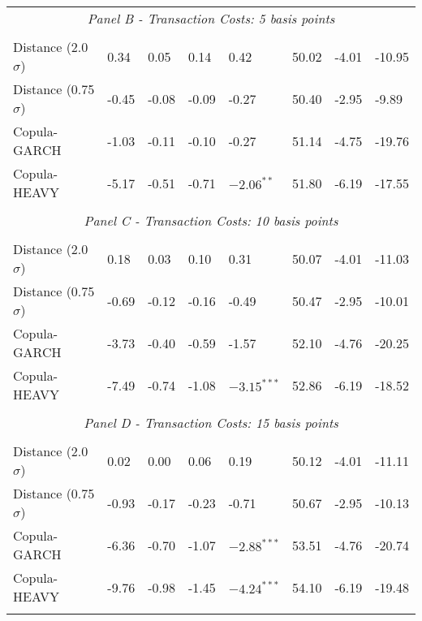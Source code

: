 \documentclass[a4paper,12pt]{report}
\begin{document}
\begin{threeparttable}[H]
\begin{tabularx}{\textwidth}{@{\extracolsep{\fill}}llllllll@{}}
		\multicolumn{8}{c}{\textit{Panel B - Transaction Costs: 5 basis points}} \\
		&       &       &       &       &       &       &  \\
		Distance (2.0$\sigma$) & 0.34  & 0.05  & 0.14  & 0.42  & 50.02 & -4.01  & -10.95 \\
		Distance (0.75$\sigma$) & -0.45 & -0.08 & -0.09 & -0.27 & 50.40 & -2.95  & -9.89 \\
		Copula-GARCH & -1.03 & -0.11 & -0.10 & -0.27 & 51.14 & -4.75  & -19.76 \\
		Copula-HEAVY & -5.17 & -0.51 & -0.71 & $-2.06^{**}$ & 51.80 & -6.19  & -17.55 \\
		\multicolumn{1}{r}{} & \multicolumn{1}{r}{} & \multicolumn{1}{r}{} & \multicolumn{1}{r}{} & \multicolumn{1}{r}{} & \multicolumn{1}{r}{} & \multicolumn{1}{r}{} & \multicolumn{1}{r}{} \\
		\multicolumn{8}{c}{\textit{Panel C - Transaction Costs: 10 basis points}} \\
		&       &       &       &       &       &       &  \\
		Distance (2.0$\sigma$) & 0.18  & 0.03  & 0.10  & 0.31  & 50.07 & -4.01  & -11.03 \\
		Distance (0.75$\sigma$) & -0.69 & -0.12 & -0.16 & -0.49 & 50.47 & -2.95  & -10.01 \\
		Copula-GARCH & -3.73 & -0.40 & -0.59 & -1.57 & 52.10 & -4.76  & -20.25 \\
		Copula-HEAVY & -7.49 & -0.74 & -1.08 & $-3.15^{***}$ & 52.86 & -6.19  & -18.52 \\
		\multicolumn{1}{r}{} & \multicolumn{1}{r}{} & \multicolumn{1}{r}{} & \multicolumn{1}{r}{} & \multicolumn{1}{r}{} & \multicolumn{1}{r}{} & \multicolumn{1}{r}{} & \multicolumn{1}{r}{} \\
		\multicolumn{8}{c}{\textit{Panel D - Transaction Costs: 15 basis points}} \\
		&       &       &       &       &       &       &  \\
		Distance (2.0$\sigma$) & 0.02  & 0.00  & 0.06  & 0.19  & 50.12 & -4.01  & -11.11 \\
		Distance (0.75$\sigma$) & -0.93 & -0.17 & -0.23 & -0.71 & 50.67 & -2.95  & -10.13 \\
		Copula-GARCH & -6.36 & -0.70 & -1.07 & $-2.88^{***}$ & 53.51 & -4.76  & -20.74 \\
		Copula-HEAVY & -9.76 & -0.98 & -1.45 & $-4.24^{***}$ & 54.10 & -6.19  & -19.48 \\
		\multicolumn{1}{r}{} & \multicolumn{1}{r}{} & \multicolumn{1}{r}{} & \multicolumn{1}{r}{} & \multicolumn{1}{r}{} & \multicolumn{1}{r}{} & \multicolumn{1}{r}{} & \multicolumn{1}{r}{} \\

\end{tabularx}
\end{threeparttable}
\end{document}
